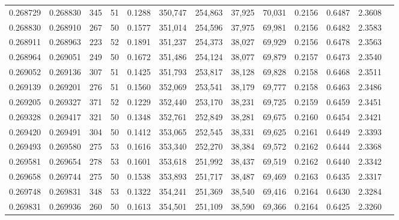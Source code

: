 \begin{tabular}{rrrrrrrrrrrrr}
0.268729 & 0.268830 &   345 &  51 &                                     0.1288 & 350,747 & 254,863 &  37,925 &  70,031 & 0.2156 & 0.6487 & 2.3608 \\
0.268830 & 0.268910 &   267 &  50 &                                     0.1577 & 351,014 & 254,596 &  37,975 &  69,981 & 0.2156 & 0.6482 & 2.3583 \\
0.268911 & 0.268963 &   223 &  52 &                                     0.1891 & 351,237 & 254,373 &  38,027 &  69,929 & 0.2156 & 0.6478 & 2.3563 \\
0.268964 & 0.269051 &   249 &  50 &                                     0.1672 & 351,486 & 254,124 &  38,077 &  69,879 & 0.2157 & 0.6473 & 2.3540 \\
0.269052 & 0.269136 &   307 &  51 &                                     0.1425 & 351,793 & 253,817 &  38,128 &  69,828 & 0.2158 & 0.6468 & 2.3511 \\
0.269139 & 0.269201 &   276 &  51 &                                     0.1560 & 352,069 & 253,541 &  38,179 &  69,777 & 0.2158 & 0.6463 & 2.3486 \\
0.269205 & 0.269327 &   371 &  52 &                                     0.1229 & 352,440 & 253,170 &  38,231 &  69,725 & 0.2159 & 0.6459 & 2.3451 \\
0.269328 & 0.269417 &   321 &  50 &                                     0.1348 & 352,761 & 252,849 &  38,281 &  69,675 & 0.2160 & 0.6454 & 2.3421 \\
0.269420 & 0.269491 &   304 &  50 &                                     0.1412 & 353,065 & 252,545 &  38,331 &  69,625 & 0.2161 & 0.6449 & 2.3393 \\
0.269493 & 0.269580 &   275 &  53 &                                     0.1616 & 353,340 & 252,270 &  38,384 &  69,572 & 0.2162 & 0.6444 & 2.3368 \\
0.269581 & 0.269654 &   278 &  53 &                                     0.1601 & 353,618 & 251,992 &  38,437 &  69,519 & 0.2162 & 0.6440 & 2.3342 \\
0.269658 & 0.269744 &   275 &  50 &                                     0.1538 & 353,893 & 251,717 &  38,487 &  69,469 & 0.2163 & 0.6435 & 2.3317 \\
0.269748 & 0.269831 &   348 &  53 &                                     0.1322 & 354,241 & 251,369 &  38,540 &  69,416 & 0.2164 & 0.6430 & 2.3284 \\
0.269831 & 0.269936 &   260 &  50 &                                     0.1613 & 354,501 & 251,109 &  38,590 &  69,366 & 0.2164 & 0.6425 & 2.3260 \\

\end{tabular}
